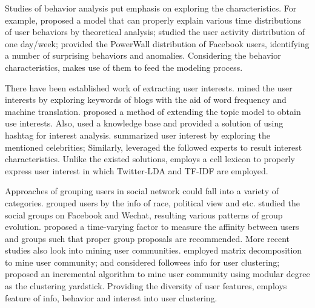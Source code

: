 Studies of behavior analysis put emphasis on exploring the characteristics.
For example, \cite{IEEEexample:jiang2013understanding} proposed a model that can properly explain various time distributions of user behaviors by theoretical analysis;
\cite{IEEEexample:conf/music/GuoLTL12} studied the user activity distribution of one day/week;
\cite{IEEEexample:journals/snam/DevineniKFF17} provided the PowerWall distribution of Facebook users, identifying a number of surprising behaviors and anomalies.
Considering the behavior characteristics, \sys{} makes use of them to feed the modeling process.

There have been established work of extracting user interests.
\cite{IEEEexample:journals/fcsc/LiuCS12} mined the user interests by exploring keywords of blogs with the aid of word frequency and machine translation.  
\cite{IEEEexample:conf/webi/XuLXY11} proposed a method of extending the topic model to obtain use interests. 
Also, \cite{IEEEexample:conf/and/MichelsonM10} used a knowledge base and \cite{IEEEexample:conf/icde/FengW14} provided a solution of using hashtag for interest analysis. 
\cite{IEEEexample:conf/wikis/LimD13} summarized user interest by exploring the mentioned celebrities; 
Similarly, \cite{IEEEexample:conf/recsys/BhattacharyaZGGG14} leveraged the followed experts to result interest characteristics.
Unlike the existed solutions, \sys{} employs a cell lexicon to properly express user interest in which Twitter-LDA \cite{IEEEexample:zhao2011comparing} and TF-IDF  are employed.

Approaches of grouping users in social network could fall into a variety of categories.
\cite{IEEEexample:conf/icwsm/PennacchiottiP11} grouped users by the info of race, political view and etc. 
\cite{IEEEexample:journals/tkdd/ZhangCFLYZY17} studied the social groups on Facebook and Wechat, resulting various patterns of group evolution.
\cite{IEEEexample:conf/aaai/WangDNGEB16} proposed a time-varying factor to measure the affinity between users and groups such that proper group proposals are recommended.
More recent studies also look into mining user communities.
\cite{IEEEexample:conf/wsdm/YangL13} employed matrix decomposition to mine user community;
\cite{IEEEexample:conf/www/RuanFP13} and \cite{IEEEexample:he2014overlapping} considered followees info for user clustering; 
\cite{IEEEexample:conf/aaai/ShiokawaFO13} proposed an incremental algorithm to mine user community using modular degree as the clustering yardstick. 
Providing the diversity of user features, \sys{} employs feature of info, behavior and interest into user clustering. 

